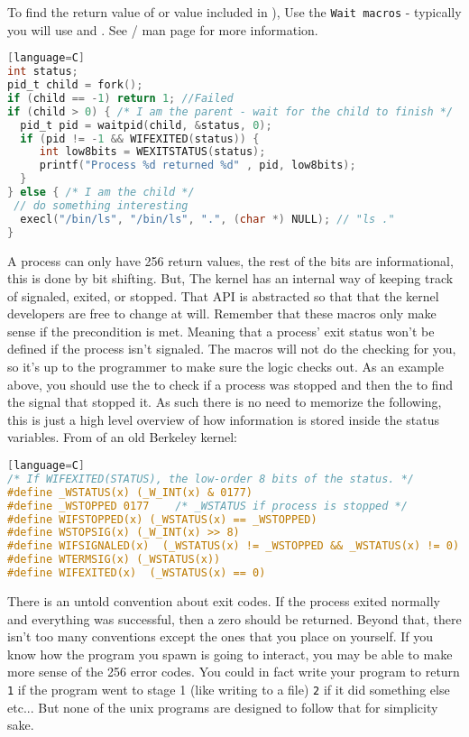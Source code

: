 To find the return value of  or value included in ), Use the \texttt{Wait macros} - typically you will use  and  . See / man page for more information.

\begin{lstlisting}[language=C][language=C]
int status;
pid_t child = fork();
if (child == -1) return 1; //Failed
if (child > 0) { /* I am the parent - wait for the child to finish */
  pid_t pid = waitpid(child, &status, 0);
  if (pid != -1 && WIFEXITED(status)) {
     int low8bits = WEXITSTATUS(status);
     printf("Process %d returned %d" , pid, low8bits);
  }
} else { /* I am the child */
 // do something interesting
  execl("/bin/ls", "/bin/ls", ".", (char *) NULL); // "ls ."
}
\end{lstlisting}

A process can only have 256 return values, the rest of the bits are informational, this is done by bit shifting. But, The kernel has an internal way of keeping track of signaled, exited, or stopped. That API is abstracted so that that the kernel developers are free to change at will. Remember that these macros only make sense if the precondition is met. Meaning that a process' exit status won't be defined if the process isn't signaled. The macros will not do the checking for you, so it's up to the programmer to make sure the logic checks out. As an example above, you should use the  to check if a process was stopped and then the  to find the signal that stopped it. As such there is no need to memorize the following, this is just a high level overview of how information is stored inside the status variables. From  of an old Berkeley kernel\cite{sys/wait.h}:

\begin{lstlisting}[language=C][language=C]
/* If WIFEXITED(STATUS), the low-order 8 bits of the status. */
#define _WSTATUS(x) (_W_INT(x) & 0177)
#define _WSTOPPED 0177    /* _WSTATUS if process is stopped */
#define WIFSTOPPED(x) (_WSTATUS(x) == _WSTOPPED)
#define WSTOPSIG(x) (_W_INT(x) >> 8)
#define WIFSIGNALED(x)  (_WSTATUS(x) != _WSTOPPED && _WSTATUS(x) != 0)
#define WTERMSIG(x) (_WSTATUS(x))
#define WIFEXITED(x)  (_WSTATUS(x) == 0)
\end{lstlisting}

There is an untold convention about exit codes. If the process exited normally and everything was successful, then a zero should be returned. Beyond that, there isn't too many conventions except the ones that you place on yourself. If you know how the program you spawn is going to interact, you may be able to make more sense of the 256 error codes. You could in fact write your program to return \texttt{1} if the program went to stage 1 (like writing to a file) \texttt{2} if it did something else etc... But none of the unix programs are designed to follow that for simplicity sake.

